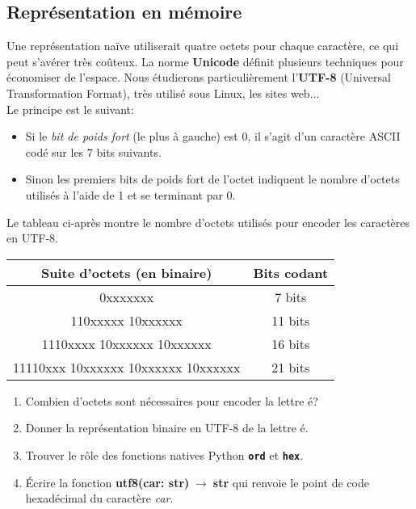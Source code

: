 \documentclass[a4paper,11pt]{article}
\begin{document}
\begin{Form}
\subsection{Représentation en mémoire}
Une représentation naïve utiliserait quatre octets pour chaque caractère, ce qui peut s'avérer très coûteux. La norme \textbf{Unicode} définit plusieurs techniques pour économiser de l'espace. Nous étudierons particulièrement l'\textbf{UTF-8} (Universal Transformation Format), très utilisé sous Linux, les sites web...\\
Le principe est le suivant:
\begin{itemize}
\item Si le \emph{bit de poids fort} (le plus à gauche) est 0, il s'agit d'un caractère ASCII codé sur les 7 bits suivants.
\item Sinon les premiers bits de poids fort de l'octet indiquent le nombre d'octets utilisés à l'aide de 1 et se terminant par 0.
\end{itemize}
Le tableau ci-après montre le nombre d'octets utilisés pour encoder les caractères en UTF-8.
\begin{center}
\begin{tabular}{|c|c|}
\hline 
Suite d'octets (en binaire) & Bits codant \\ 
\hline 
0xxxxxxx & 7 bits \\ 
\hline 
110xxxxx 10xxxxxx & 11 bits \\ 
\hline 
1110xxxx 10xxxxxx 10xxxxxx & 16 bits \\ 
\hline 
11110xxx 10xxxxxx 10xxxxxx 10xxxxxx & 21 bits \\ 
\hline 
\end{tabular}
\end{center}
\begin{activite}
\begin{enumerate}
\item Combien d'octets sont nécessaires pour encoder la lettre é?
\item Donner la représentation binaire en UTF-8 de la lettre é.
\item Trouver le rôle des fonctions natives Python \texttt{\textbf{ord}} et \texttt{\textbf{hex}}.
\item Écrire la fonction \textbf{utf8(car: str)$\;\rightarrow\;$str} qui renvoie le point de code hexadécimal du caractère \emph{car}.
\end{enumerate}
\end{activite}
\end{Form}
\end{document}

